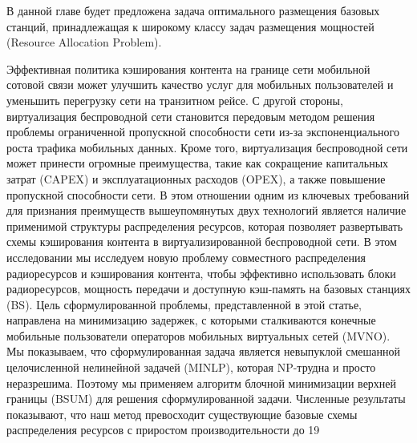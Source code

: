 
В данной главе будет предложена задача оптимального размещения базовых станций, принадлежащая к широкому классу задач размещения мощностей (Resource Allocation Problem).


Эффективная политика кэширования контента на границе сети мобильной сотовой связи может улучшить качество услуг для мобильных пользователей и уменьшить перегрузку сети на транзитном рейсе. С другой стороны, виртуализация беспроводной сети становится передовым методом решения проблемы ограниченной пропускной способности сети из-за экспоненциального роста трафика мобильных данных. Кроме того, виртуализация беспроводной сети может принести огромные преимущества, такие как сокращение капитальных затрат (CAPEX) и эксплуатационных расходов (OPEX), а также повышение пропускной способности сети. В этом отношении одним из ключевых требований для признания преимуществ вышеупомянутых двух технологий является наличие применимой структуры распределения ресурсов, которая позволяет развертывать схемы кэширования контента в виртуализированной беспроводной сети. В этом исследовании мы исследуем новую проблему совместного распределения радиоресурсов и кэширования контента, чтобы эффективно использовать блоки радиоресурсов, мощность передачи и доступную кэш-память на базовых станциях (BS). Цель сформулированной проблемы, представленной в этой статье, направлена ​​на минимизацию задержек, с которыми сталкиваются конечные мобильные пользователи операторов мобильных виртуальных сетей (MVNO). Мы показываем, что сформулированная задача является невыпуклой смешанной целочисленной нелинейной задачей (MINLP), которая NP-трудна и просто неразрешима. Поэтому мы применяем алгоритм блочной минимизации верхней границы (BSUM) для решения сформулированной задачи. Численные результаты показывают, что наш метод превосходит существующие базовые схемы распределения ресурсов с приростом производительности до 19%

